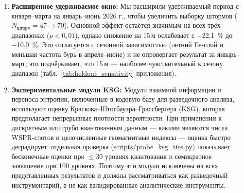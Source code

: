 \documentclass{agujournal2019}
\begin{document}
\begin{enumerate}
	\item \textbf{Расширенное удерживаемое окно:} Мы расширили
	      удерживаемый период с января--марта на январь--июнь 2026 г.,
	      чтобы увеличить выборку штормов
	      ($N_{\mbox{шторм}} = 47 \rightarrow 70$). Основной эффект
	      остаётся значимым на всех трёх диапазонах ($p < 0{,}01$),
	      однако снижение на 15\,м ослабевает с \SI{-22.1}{\percent}
	      до \SI{-10.0}{\percent}. Это согласуется с сезонной
	      зависимостью (летний Es-слой и меньшая частота бурь в
	      апреле--июне) и не опровергает результат за январь--март;
	      это подчёркивает, что 15\,м — наиболее чувствительный к
	      сезону диапазон (табл.~\ref{tab:heldout_sensitivity}
	      приложения).

\item \textbf{Экспериментальные модули KSG:} Модули взаимной информации
	      и переноса энтропии, включённые в кодовую базу для
	      разведочного анализа, используют оценку
	      Краскова--Штогбауэра--Грассбергера (KSG), которая предполагает
	      непрерывные плотности вероятности. При применении к дискретным
	      или грубо квантованным данным — какими являются числа
	      WSPR-спотов и целочисленные геомагнитные индексы — оценка быстро
	      деградирует: отдельная проверка (scripts/probe\_ksg\_ties.py)
	      показывает бесконечные оценки при $\le$30 уровнях квантования
	      и семикратное завышение при 100 уровнях. Поэтому эти модули
	      исключены из всех представленных результатов и должны
	      рассматриваться как разведочный инструментарий, а не как
	      валидированные аналитические инструменты.


\end{enumerate}
\end{document}
